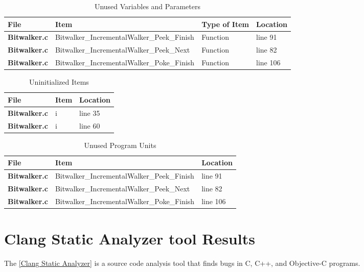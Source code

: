 {\footnotesize\sffamily\centering
  \begin{longtable}{||p{}|p{}|p{}|p{}||}
  \caption{Unused Variables and Parameters}\\
    \hline\hline
    \textbf{File} & \textbf{Item} & \textbf{Type of Item} & \textbf{Location} \\
    \hline\hline
    \endhead
    \hline\hline
    \endfoot
    \textbf{Bitwalker.c}
& Bitwalker\_IncrementalWalker\_Peek\_Finish & Function & line 91
    \\
    \hline
    \textbf{Bitwalker.c}
& Bitwalker\_IncrementalWalker\_Peek\_Next & Function & line 82
    \\
    \hline
    \textbf{Bitwalker.c}
& Bitwalker\_IncrementalWalker\_Poke\_Finish & Function & line 106
    \\
    \hline
\end{longtable}}

{\footnotesize\sffamily\centering
  \begin{longtable}{||p{}|p{}|p{}||}
  \caption{Uninitialized Items}\\
    \hline\hline
    \textbf{File} & \textbf{Item} & \textbf{Location} \\
    \hline\hline
    \endhead
    \hline\hline
    \endfoot
    \textbf{Bitwalker.c}
& i & line 35
    \\
    \hline
    \textbf{Bitwalker.c}
& i & line 60
    \\
    \hline
\end{longtable}}

{\footnotesize\sffamily\centering
  \begin{longtable}{||p{}|p{}|p{}||}
  \caption{Unused Program Units}\\
    \hline\hline
    \textbf{File} & \textbf{Item} & \textbf{Location} \\
    \hline\hline
    \endhead
    \hline\hline
    \endfoot
    \textbf{Bitwalker.c}
& Bitwalker\_IncrementalWalker\_Peek\_Finish & line 91
    \\
    \hline
    \textbf{Bitwalker.c}
& Bitwalker\_IncrementalWalker\_Peek\_Next & line 82
    \\
    \hline
    \textbf{Bitwalker.c}
& Bitwalker\_IncrementalWalker\_Poke\_Finish & line 106
    \\
    \hline
\end{longtable}}

\section{Clang Static Analyzer tool Results}
The \href{http://clang-analyzer.llvm.org/}{[Clang Static Analyzer]} is a source code analysis tool that finds bugs in C, C++, and Objective-C programs.

